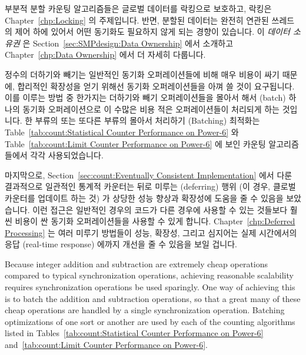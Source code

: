 부분적 분할 카운팅 알고리즘들은 글로벌 데이터를 락킹으로 보호하고, 락킹은
Chapter~\ref{chp:Locking} 의 주제입니다.
반면, 분할된 데이터는 완전히 연관된 쓰레드의 제어 하에 있어서 어떤 동기화도
필요하지 않게 되는 경향이 있습니다.
이 \emph{데이터 소유권} 은 Section~\ref{sec:SMPdesign:Data Ownership} 에서
소개하고 Chapter~\ref{chp:Data Ownership} 에서 더 자세히 다룹니다.

정수의 더하기와 빼기는 일반적인 동기화 오퍼레이션들에 비해 매우 비용이 싸기
때문에, 합리적인 확장성을 얻기 위해선 동기화 오퍼레이션들을 아껴 쓸 것이
요구됩니다.
이를 이루는 방법 중 한가지는 더하기와 빼기 오퍼레이션들을 몰아서 해서 (batch)
하나의 동기화 오퍼레이션으로 이 수많은 비용 적은 오퍼레이션들이 처리되게 하는
것입니다.
한 부류의 또는 또다른 부류의 몰아서 처리하기 (Batching) 최적화는
Table~\ref{tab:count:Statistical Counter Performance on Power-6} 와
Table~\ref{tab:count:Limit Counter Performance on Power-6} 에 보인 카운팅
알고리즘들에서 각각 사용되었습니다.

마지막으로, Section~\ref{sec:count:Eventually Consistent Implementation} 에서
다룬 결과적으로 일관적인 통계적 카운터는 뒤로 미루는 (deferring) 행위 (이 경우,
클로벌 카운터를 업데이트 하는 것) 가 상당한 성능 향상과 확장성에 도움을 줄 수
있음을 보았습니다.
이런 접근은 일반적인 경우의 코드가 다른 경우에 사용할 수 있는 것들보다 훨씬
비용이 싼 동기화 오퍼레이션들을 사용할 수 있게 합니다.
Chapter~\ref{chp:Deferred Processing} 는 여러 미루기 방법들이 성능, 확장성,
그리고 심지어는 실제 시간에서의 응답 (real-time response) 에까지 개선을 줄 수
있음을 보일 겁니다.
\iffalse

Because integer addition and subtraction are extremely cheap operations
compared to typical synchronization operations, achieving reasonable
scalability requires synchronization operations be used sparingly.
One way of achieving this is to batch the addition and subtraction
operations, so that a great many of these cheap operations are handled
by a single synchronization operation.
Batching optimizations of one sort or another are used by each of
the counting algorithms listed in
Tables~\ref{tab:count:Statistical Counter Performance on Power-6}
and~\ref{tab:count:Limit Counter Performance on Power-6}.

